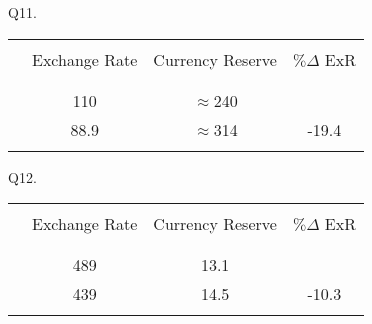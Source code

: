 \documentclass[12pt]{article}
\begin{document}
\noindent Q11.
\begin{table}[!h]
	\centering
	\begin{tabular}[t]{l c c c }
		\hline
		&&&\\
		& Exchange Rate & Currency Reserve & $\%\Delta$ ExR  \\
		&	&&\\
		\hline
		&&&\\
		& 110 & $\approx$240 &   \\
		& 88.9 & $\approx$314  &  -19.4\\
		&&&\\
		\hline
	\end{tabular}
\end{table}

\noindent Q12.
\begin{table}[!h]
	\centering
	\begin{tabular}[t]{l c c c }
		\hline
		&&&\\
		& Exchange Rate & Currency Reserve & $\%\Delta$ ExR  \\
		&	&&\\
		\hline
		&&&\\
		& 489 & 13.1 &   \\
		& 439 & 14.5   &  -10.3\\
		&&&\\
		\hline
	\end{tabular}
\end{table}
\end{document}
